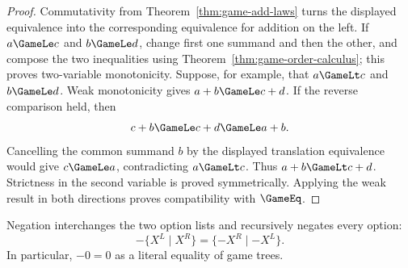 \begin{proof}
  Commutativity from Theorem~\ref{thm:game-add-laws} turns the displayed
  equivalence into the
  corresponding equivalence for addition on the left.  If
  \(a\GameLe c\) and \(b\GameLe d\), change first one summand and then the
  other, and compose the two inequalities using
  Theorem~\ref{thm:game-order-calculus}; this proves two-variable
  monotonicity.  Suppose, for example, that \(a\GameLt c\) and
  \(b\GameLe d\).  Weak monotonicity gives \(a+b\GameLe c+d\).  If the reverse
  comparison held, then
  \[
    c+b\GameLe c+d\GameLe a+b.
  \]
  Cancelling the common summand \(b\) by the displayed translation equivalence
  would give \(c\GameLe a\), contradicting \(a\GameLt c\).  Thus
  \(a+b\GameLt c+d\).  Strictness in the second variable is proved
  symmetrically.  Applying the weak result in both directions proves
  compatibility with \(\GameEq\).
\end{proof}

\begin{definition}[Negation]
  \label{def:game-neg}
  \leanok
  Negation interchanges the two option lists and recursively negates every option:
  \[
    -\{X^L\mid X^R\}=\{-X^R\mid -X^L\}.
  \]
  In particular, \(-0=0\) as a literal equality of game trees.
\end{definition}


